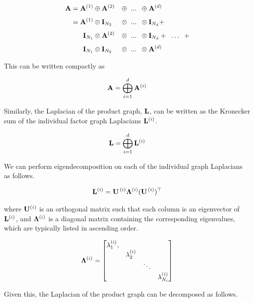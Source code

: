 \begin{alignat}{4}
    \mathbf{A} = \mathbf{A}^{(1)} & \oplus \mathbf{A}^{(2)} & \oplus \;\; ... \;\; & \oplus \mathbf{A}^{(d)} \notag \\[0.1cm]
    = \mathbf{A}^{(1)} & \otimes \mathbf{I}_{N_2} & \otimes \;\; ... \;\; & \otimes \mathbf{I}_{N_d} +  \notag \\[0.1cm]
    \mathbf{I}_{N_1} & \otimes \mathbf{A}^{(2)} & \otimes \;\; ... \;\; & \otimes \mathbf{I}_{N_d} + \;\; \ldots \;\; +  \notag \\[0.1cm]
    \mathbf{I}_{N_1} & \otimes \mathbf{I}_{N_2} & \otimes \;\; ... \;\; & \otimes \mathbf{A}^{(d)}  
\end{alignat}
    
This can be written compactly as 

\begin{equation}
    \mathbf{A} = \bigoplus_{i=1}^d  \mathbf{A}^{(i)}
\end{equation}

Similarly, the Laplacian of the product graph, $\mathbf{L}$, can be written as the Kronecker sum of the individual factor graph Laplacians $\mathbf{L}^{(i)}$. 

\begin{equation}
    \mathbf{L} = \bigoplus_{i=1}^d  \mathbf{L}^{(i)}
\end{equation}

We can perform eigendecomposition on each of the individual graph Laplacians as follows. 

\begin{equation}
    \mathbf{L}^{(i)} = \mathbf{U}^{\,(i)} \mathbf{\Lambda}^{(i)} (\mathbf{U}^{\,(i)})^\top
\end{equation}

\noindent where $ \mathbf{U}^{(i)}$ is an orthogonal matrix such that each column is an eigenvector of $\mathbf{L}^{(i)}$, and $\mathbf{\Lambda}^{(i)}$ is a diagonal matrix containing the corresponding eigenvalues, which are typically listed in ascending order. 

$$
\mathbf{\Lambda}^{(i)} = 
\begin{bmatrix}
    \lambda_1^{(i)}, &                 &        &                 \\
                     & \lambda_2^{(i)} &        &                 \\
                     &                 & \ddots &                 \\
                     &                 &        & \lambda_{N_i}^{(i)} \\
\end{bmatrix}
$$

Given this, the Laplacian of the product graph can be decomposed as follows. 


